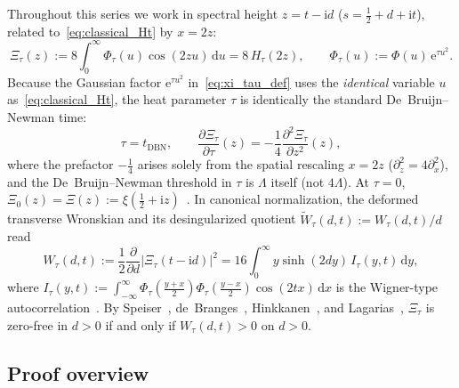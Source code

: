 \documentclass[11pt,reqno]{amsart}
\theoremstyle{plain}
\theoremstyle{definition}
\theoremstyle{remark}
\numberwithin{equation}{section}
\newcommand{\dd}{\,\mathrm{d}}
\newcommand{\ii}{\mathrm{i}}
\newcommand{\ee}{\mathrm{e}}
\begin{document}
Throughout this series we work in spectral height $z = t - \ii d$ ($s = \frac{1}{2} + d + \ii t$), related to~\eqref{eq:classical_Ht} by $x = 2z$:
\begin{equation}\label{eq:xi_tau_def}
\Xi_\tau(z) := 8\int_0^{\infty} \Phi_\tau(u)\cos(2zu)\dd u = 8\,H_\tau(2z), \qquad \Phi_\tau(u) := \Phi(u)\,\ee^{\tau u^2}.
\end{equation}
Because the Gaussian factor $\ee^{\tau u^2}$ in~\eqref{eq:xi_tau_def} uses the \emph{identical} variable $u$ as~\eqref{eq:classical_Ht}, the heat parameter $\tau$ is identically the standard De~Bruijn--Newman time:
\begin{equation}\label{eq:tau_equals_tdbn}
\tau = t_{\mathrm{DBN}}, \qquad \frac{\partial\Xi_\tau}{\partial\tau}(z) = -\frac{1}{4}\frac{\partial^2\Xi_\tau}{\partial z^2}(z),
\end{equation}
where the prefactor $-\frac{1}{4}$ arises solely from the spatial rescaling $x = 2z$ ($\partial_z^2 = 4\partial_x^2$), and the De~Bruijn--Newman threshold in $\tau$ is $\Lambda$ itself (not $4\Lambda$). At $\tau = 0$, $\Xi_0(z) = \Xi(z) := \xi(\frac{1}{2} + \ii z)$~\cite{riemann1859,titchmarsh1986}. In canonical normalization, the deformed transverse Wronskian and its desingularized quotient $\widetilde{W}_\tau(d,t) := W_\tau(d,t)/d$ read
\begin{equation}\label{eq:canonical_W_tau}
W_\tau(d,t) := \frac{1}{2}\frac{\partial}{\partial d}\bigl\lvert\Xi_\tau(t - \ii d)\bigr\rvert^2 = 16\int_0^{\infty} y\sinh(2dy)\,I_\tau(y,t)\dd y,
\end{equation}
where $I_\tau(y,t) := \int_{-\infty}^{\infty}\Phi_\tau(\frac{y+x}{2})\Phi_\tau(\frac{y-x}{2})\cos(2tx)\dd x$ is the Wigner-type autocorrelation~\cite{wigner1932,hudson1974}. By Speiser~\cite{speiser1934}, de~Branges~\cite{debranges1968}, Hinkkanen~\cite{hinkkanen1997}, and Lagarias~\cite{lagarias1999}, $\Xi_\tau$ is zero-free in $d > 0$ if and only if $W_\tau(d,t) > 0$ on $d > 0$.

\subsection{Proof overview}\label{subsec:overview}
\end{document}

